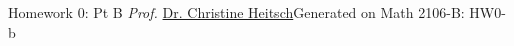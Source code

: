 \newpage{}
{Homework 0: Pt B}
{\textit{Prof.} \href{https://ceheitsch.github.io/webpage/}{Dr. Christine Heitsch}}{Generated on \generatedOn}
{Math 2106-B: HW0-b}

% 











